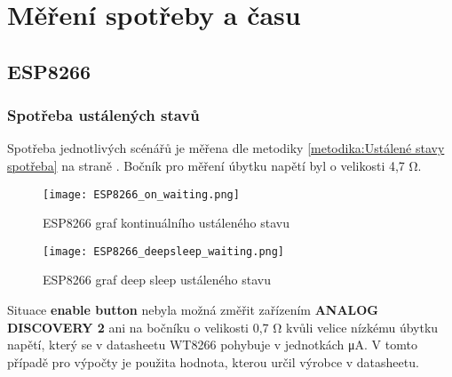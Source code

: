 \documentclass[a4paper, 12pt]{report}
\begin{document}

	\chapter{Měření spotřeby a času}
		\section{ESP8266}
			\subsection{Spotřeba ustálených stavů}
					Spotřeba jednotlivých scénářů je měřena dle metodiky \ref{metodika:Ustálené stavy spotřeba} na straně \pageref{metodika:Ustálené stavy spotřeba}. Bočník pro měření úbytku napětí byl o velikosti 4,7 \si{\ohm}. \\

					\begin{figure}[h]
						\centering
						\texttt{[image: ESP8266\_on\_waiting.png]}
						\caption{ESP8266 graf kontinuálního ustáleného stavu }
						\label{ESP8266_on_waiting}
					\end{figure}
					\begin{figure}[h]
						\centering
						\texttt{[image: ESP8266\_deepsleep\_waiting.png]}
						\caption{ESP8266 graf deep sleep ustáleného stavu}
						\label{ESP8266_on_waiting}
					\end{figure}

					Situace {\bf enable button} nebyla možná změřit zařízením {\bf ANALOG DISCOVERY 2} ani na bočníku o velikosti 0,7 \si{\ohm} kvůli velice nízkému úbytku napětí, který se v datasheetu WT8266 pohybuje v jednotkách \si{\micro A}. V tomto případě pro výpočty je použita hodnota, kterou určil výrobce v datasheetu.
\end{document}
